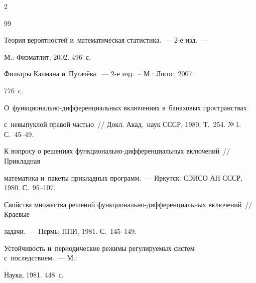 \begin{multicols}{2}
{{\begin{thebibliography}{99}



Теория вероятностей и~математическая статистика.~--- 2-е изд.~--- 

М.: Физ\-мат\-лит, 2002. 496~с.






Фильтры Калмана и~Пугачёва.~--- 2-е изд.~-- М.: Логос, 2007. 

776~с.






 О~функ\-ци\-о\-наль\-но-диф\-фе\-рен\-ци\-аль\-ных включениях в~банаховых пространствах 

 с~невыпуклой правой частью~// Докл. Акад.\ наук СССР, 1980. Т.~254. №\,1. С.~45--49.






 К вопросу о решениях функ\-ци\-о\-наль\-но-диф\-фе\-рен\-ци\-аль\-ных  включений~// Прикладная 

математика и~пакеты при\-клад\-ных программ.~--- Иркутск: СЭИСО АН СССР, 1980. С.~95--107.






 Свойства множества решений функ\-ци\-о\-наль\-но-диф\-фе\-рен\-ци\-аль\-ных включений~// Краевые 

задачи.~--- Пермь: ППИ, 1981. С.~145--149.










 Устойчивость и~периодические режимы ре\-гу\-ли\-ру\-емых сис\-тем с~последствием.~--- М.: 

Наука, 1981. 448~с.




\end{thebibliography}}}
\end{multicols}
